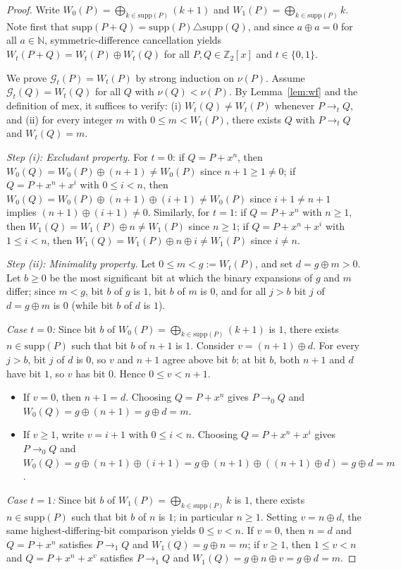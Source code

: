 \documentclass[11pt,a4paper]{article}
\theoremstyle{definition}
\newcommand{\Z}{\mathbb{Z}}
\newcommand{\N}{\mathbb{N}}
\newcommand{\SG}{\mathcal{G}}
\newcommand{\mex}{\mathrm{mex}}
\newcommand{\supp}{\mathrm{supp}}
\begin{document}
\begin{proof}
Write $W_0(P) = \bigoplus_{k \in \supp(P)} (k+1)$ and $W_1(P) = \bigoplus_{k \in \supp(P)} k$.
Note first that $\supp(P + Q) = \supp(P) \triangle \supp(Q)$, and since $a \oplus a = 0$
for all $a \in \N$, symmetric-difference cancellation yields
$W_t(P + Q) = W_t(P) \oplus W_t(Q)$ for all $P,Q \in \Z_2[x]$ and $t \in \{0,1\}$.

We prove $\SG_t(P) = W_t(P)$ by strong induction on $\nu(P)$. Assume $\SG_t(Q) = W_t(Q)$
for all $Q$ with $\nu(Q) < \nu(P)$. By Lemma~\ref{lem:wf} and the definition of $\mex$, it
suffices to verify: (i) $W_t(Q) \neq W_t(P)$ whenever $P \to_t Q$, and (ii) for every
integer $m$ with $0 \le m < W_t(P)$, there exists $Q$ with $P \to_t Q$ and $W_t(Q) = m$.

\smallskip
\noindent\emph{Step (i): Excludant property.}
For $t = 0$: if $Q = P + x^n$, then $W_0(Q) = W_0(P) \oplus (n+1) \neq W_0(P)$ since
$n + 1 \ge 1 \neq 0$; if $Q = P + x^n + x^i$ with $0 \le i < n$, then
$W_0(Q) = W_0(P) \oplus (n+1) \oplus (i+1) \neq W_0(P)$ since $i + 1 \neq n + 1$ implies
$(n+1) \oplus (i+1) \neq 0$. Similarly, for $t = 1$: if $Q = P + x^n$ with $n \ge 1$, then
$W_1(Q) = W_1(P) \oplus n \neq W_1(P)$ since $n \ge 1$; if $Q = P + x^n + x^i$ with
$1 \le i < n$, then $W_1(Q) = W_1(P) \oplus n \oplus i \neq W_1(P)$ since $i \neq n$.

\smallskip
\noindent\emph{Step (ii): Minimality property.}
Let $0 \le m < g := W_t(P)$, and set $d = g \oplus m > 0$. Let $b \ge 0$ be the most
significant bit at which the binary expansions of $g$ and $m$ differ; since $m < g$, bit $b$
of $g$ is $1$, bit $b$ of $m$ is $0$, and for all $j > b$ bit $j$ of $d = g \oplus m$ is
$0$ (while bit $b$ of $d$ is $1$).

\emph{Case $t = 0$:} Since bit $b$ of $W_0(P) = \bigoplus_{k\in\supp(P)} (k+1)$ is $1$,
there exists $n \in \supp(P)$ such that bit $b$ of $n + 1$ is $1$. Consider
$v = (n + 1) \oplus d$. For every $j > b$, bit $j$ of $d$ is $0$, so $v$ and $n+1$ agree
above bit $b$; at bit $b$, both $n+1$ and $d$ have bit $1$, so $v$ has bit $0$. Hence
$0 \le v < n + 1$.
\begin{itemize}
  \setlength{\itemsep}{2pt}
  \item If $v = 0$, then $n + 1 = d$. Choosing $Q = P + x^n$ gives $P \to_0 Q$ and
    $W_0(Q) = g \oplus (n+1) = g \oplus d = m$.
  \item If $v \ge 1$, write $v = i + 1$ with $0 \le i < n$. Choosing $Q = P + x^n + x^i$
    gives $P \to_0 Q$ and
    $W_0(Q) = g \oplus (n+1) \oplus (i+1) = g \oplus (n+1) \oplus ((n+1) \oplus d)
    = g \oplus d = m$.
\end{itemize}

\emph{Case $t = 1$:} Since bit $b$ of $W_1(P) = \bigoplus_{k\in\supp(P)} k$ is $1$, there
exists $n \in \supp(P)$ such that bit $b$ of $n$ is $1$; in particular $n \ge 1$. Setting
$v = n \oplus d$, the same highest-differing-bit comparison yields $0 \le v < n$. If
$v = 0$, then $n = d$ and $Q = P + x^n$ satisfies $P \to_1 Q$ and $W_1(Q) = g \oplus n = m$;
if $v \ge 1$, then $1 \le v < n$ and $Q = P + x^n + x^v$ satisfies $P \to_1 Q$ and
$W_1(Q) = g \oplus n \oplus v = g \oplus d = m$.
\end{proof}
\end{document}
